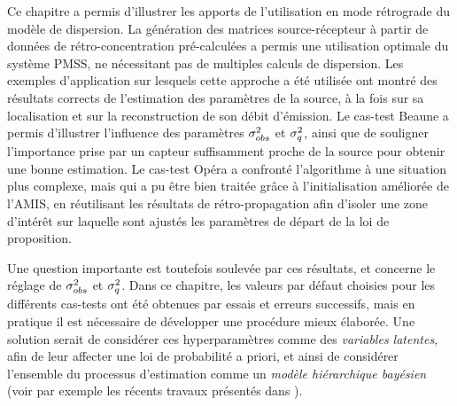 {
Ce chapitre a permis d'illustrer les apports de l'utilisation en mode rétrograde du modèle de dispersion. La génération des matrices source-récepteur à partir de données de rétro-concentration pré-calculées a permis une utilisation optimale du système PMSS, ne nécessitant pas de multiples calculs de dispersion. Les exemples d'application sur lesquels cette approche a été utilisée ont montré des résultats corrects de l'estimation des paramètres de la source, à la fois sur sa localisation et sur la reconstruction de son débit d'émission. Le cas-test Beaune a permis d'illustrer l'influence des paramètres ${\sigma_{obs}^2}$ et $\sigma_q^2$, ainsi que de souligner l'importance prise par un capteur suffisamment proche de la source pour obtenir une bonne estimation. Le cas-test Opéra a confronté l'algorithme à une situation plus complexe, mais qui a pu être bien traitée grâce à l'initialisation améliorée de l'AMIS, en réutilisant les résultats de rétro-propagation afin d'isoler une zone d'intérêt sur laquelle sont ajustés les paramètres de départ de la loi de proposition.\\}

{
	Une question importante est toutefois soulevée par ces résultats, et concerne le réglage de ${\sigma_{obs}^2}$ et $\sigma_q^2$. Dans ce chapitre, les valeurs par défaut choisies pour les différents cas-tests ont été obtenues par essais et erreurs successifs, mais en pratique il est nécessaire de développer une procédure mieux élaborée. Une solution serait de considérer ces hyperparamètres comme des \textit{variables latentes}, afin de leur affecter une loi de probabilité a priori, et ainsi de considérer l'ensemble du processus d'estimation comme un \textit{modèle hiérarchique bayésien} (voir par exemple les récents travaux présentés dans \cite{Smidl2015}).
}




